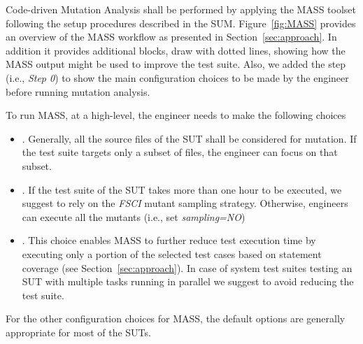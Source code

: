 Code-driven Mutation Analysis shall be performed by applying the MASS toolset following the setup procedures described in the SUM. Figure~\ref{fig:MASS} provides an overview of the MASS workflow as presented in Section~\ref{sec:approach}. In addition it provides additional blocks, draw with dotted lines, showing how the MASS output might be used to improve the test suite. Also, we added the step  (i.e., \emph{Step 0}) to show the main configuration choices to be made by the engineer before running mutation analysis.

To run MASS, at a high-level, the engineer needs to make the following choices
\begin{itemize}
\item {}. Generally, all the source files of the SUT shall be considered for mutation. If the test suite targets only a subset  of files, the engineer can focus on that subset.
\item {}. If the test suite of the SUT takes more than one hour to be executed, we suggest to rely on the \emph{FSCI} mutant sampling strategy. Otherwise, engineers can execute all the mutants (i.e., set \emph{sampling=NO})
\item {}. This choice enables MASS to further reduce test execution time by executing only a portion of the selected test cases based on statement coverage (see Section~\ref{sec:approach}). In case of system test suites testing an SUT with multiple tasks running in parallel we suggest to avoid reducing the test suite.
\end{itemize}

For the other configuration choices for MASS, the default options are generally appropriate for most of the SUTs.

